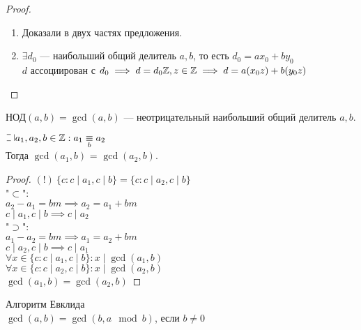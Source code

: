 \begin{normalsize}
\begin{proof}
    \begin{enumerate}
        \item Доказали в двух частях предложения.
        \item $\exists d_0$ --- наибольший общий делитель $a, b$, то есть $d_0 = ax_0 + by_0$\\
        $d$ ассоциирован с $d_0 \implies d = d_0\mathbb{Z}, z \in \mathbb{Z} \implies d = a(x_0z) + b(y_0z)$
    \end{enumerate}
\end{proof}

\begin{defn}
    НОД$(a, b) = \gcd(a, b)$ --- неотрицательный наибольший общий делитель $a, b$.
\end{defn}

\begin{theorem-non}
    $\letus a_1, a_2, b \in \mathZ: a_1 \equivm{b} a_2$\\
    Тогда $\gcd(a_1, b)$ = $\gcd(a_2, b)$.
\end{theorem-non}

\begin{proof}
    $(!)~\{c: c \mid a_1, c \mid b \} = \{c : c \mid a_2, c \mid b\}$\\ 
    "$\subset$":\\
    $a_2 - a_1 = bm \implies a_2 = a_1 + bm$\\
    $c \mid a_1, c \mid b \implies c \mid a_2$\\
    "$\supset$":\\
    $a_1 - a_2 = bm \implies a_1 = a_2 + bm$\\
    $c \mid a_2, c \mid b \implies c \mid a_1$\\
    $\forall x \in \{c: c \mid a_1, c \mid b \}: x \mid \gcd(a_1, b)$\\
    $\forall x \in \{c: c \mid a_2, c \mid b \}: x \mid \gcd(a_2, b)$\\
    $\gcd(a_1, b) = \gcd(a_2, b)$
\end{proof}

\begin{defn} 
    Алгоритм Евклида\\
    $\gcd(a, b) = \gcd(b, a \mod b)$, если $b \neq 0$\\
\end{defn}

\end{normalsize}